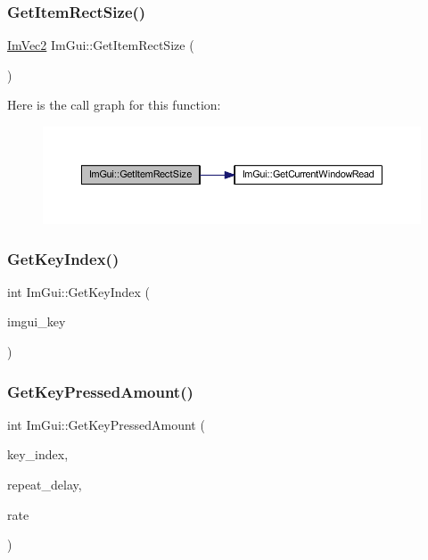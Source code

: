 \subsubsection{\texorpdfstring{Get\+Item\+Rect\+Size()}{GetItemRectSize()}}
{\footnotesize\ttfamily \mbox{\hyperlink{struct_im_vec2}{Im\+Vec2}} Im\+Gui\+::\+Get\+Item\+Rect\+Size (\begin{DoxyParamCaption}{ }\end{DoxyParamCaption})}

Here is the call graph for this function\+:
\nopagebreak
\begin{figure}[H]
\begin{center}
\leavevmode
\includegraphics[width=350pt]{namespace_im_gui_a3303d1c37041307e11fd46fc43b2274d_cgraph}
\end{center}
\end{figure}
\mbox{\label{namespace_im_gui_a6cf235f0d0787d51a93f6d90e0bdff9b}} 
\subsubsection{\texorpdfstring{Get\+Key\+Index()}{GetKeyIndex()}}
{\footnotesize\ttfamily int Im\+Gui\+::\+Get\+Key\+Index (\begin{DoxyParamCaption}\item[{\mbox{\hyperlink{imgui_8h_a1671ca739cf1384a8cc268758f27b4e7}{Im\+Gui\+Key}}}]{imgui\+\_\+key }\end{DoxyParamCaption})}

\mbox{\label{namespace_im_gui_ad94a09fc01052f02fe11bec5a3c11275}} 
\subsubsection{\texorpdfstring{Get\+Key\+Pressed\+Amount()}{GetKeyPressedAmount()}}
{\footnotesize\ttfamily int Im\+Gui\+::\+Get\+Key\+Pressed\+Amount (\begin{DoxyParamCaption}\item[{int}]{key\+\_\+index,  }\item[{float}]{repeat\+\_\+delay,  }\item[{float}]{rate }\end{DoxyParamCaption})}

